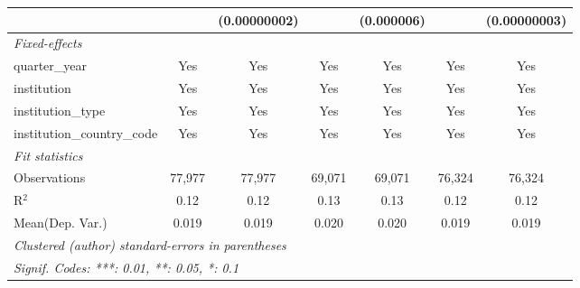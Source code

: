 \begin{tabular}{lcccccc}
                                      &               & (0.00000002)  &               & (0.000006)     &              & (0.00000003)\\   
   \midrule
   \emph{Fixed-effects}\\
   quarter\_year                      & Yes           & Yes           & Yes           & Yes            & Yes          & Yes\\  
   institution                        & Yes           & Yes           & Yes           & Yes            & Yes          & Yes\\  
   institution\_type                  & Yes           & Yes           & Yes           & Yes            & Yes          & Yes\\  
   institution\_country\_code         & Yes           & Yes           & Yes           & Yes            & Yes          & Yes\\  
   \midrule
   \emph{Fit statistics}\\
   Observations                       & 77,977        & 77,977        & 69,071        & 69,071         & 76,324       & 76,324\\  
   R$^2$                              & 0.12          & 0.12          & 0.13          & 0.13           & 0.12         & 0.12\\  
Mean(Dep. Var.) & 0.019 & 0.019 & 0.020 & 0.020 & 0.019 & 0.019 \\
   \midrule \midrule
   \multicolumn{7}{l}{\emph{Clustered (author) standard-errors in parentheses}}\\
   \multicolumn{7}{l}{\emph{Signif. Codes: ***: 0.01, **: 0.05, *: 0.1}}\\
\end{tabular}
\par\endgroup
